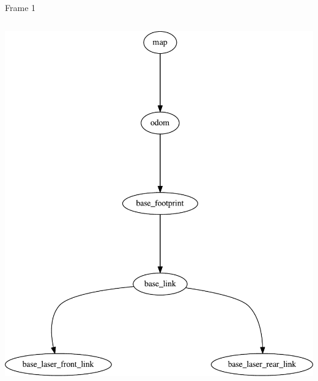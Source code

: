 \begin{frame}{Frame 1}
\begin{columns}
\begin{column}{0.25\textwidth}  %
\includegraphics[width=\textwidth]{slides/gfx/frames_cleaned}
\end{column}
\end{columns}

 
\end{frame}